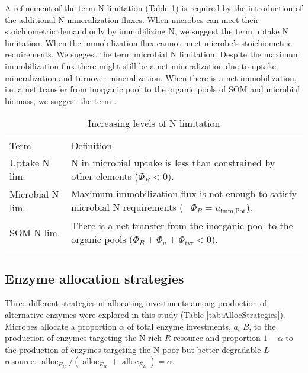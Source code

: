 A refinement of the term N limitation (Table \ref{tab:NutrientLimDefs}) is
required by the introduction of the additional N mineralization fluxes.
When microbes can meet their stoichiometric demand only by immobilizing
 N, we suggest the term uptake N limitation.
When the immobilization flux cannot meet microbe's stoichiometric requirements,
We suggest the term microbial N limitation. Despite the maximum immobilization
flux there might still be a net mineralization due to uptake mineralization and
turnover mineralization.
When there is a net immobilization, i.e. a net transfer from inorganic pool to
the organic pools of SOM and microbial biomass, we suggest the term .

\begin{table}[t]
\caption{Increasing levels of N limitation \label{tab:NutrientLimDefs}}
\centering
\begin{tabular}{lp{5.5cm}}
\tophline
Term &  Definition \\
\middlehline
Uptake N lim. & N in microbial uptake is less than 
constrained by other elements (${\Phi_B < 0}$).
\\
Microbial N lim. & Maximum immobilization flux is not enough to satisfy
microbial N requirements (${-\Phi_B =
u_{\operatorname{imm,Pot}}}$).
\\
SOM N lim. & There is a net transfer from the inorganic pool to
the organic pools (${\Phi_B+\Phi_u+\Phi_{\operatorname{tvr}}<0}$).
\\
\bottomhline
\end{tabular}
\end{table}
 



\subsection{ Enzyme allocation strategies} 
\label{sec:AllocStrategies}

Three different strategies of allocating investments among production of
alternative enzymes were explored in this study (Table
\ref{tab:AllocStrategies}). Microbes allocate a proportion $\alpha$ of total
enzyme investments, $a_e\,B$, to the production of enzymes targeting the N rich
$R$ resource and proportion $1 - \alpha$ to the production of enzymes targeting
the N poor but better degradable $L$ resource: $\operatorname{alloc}_{E_R} /
(\operatorname{alloc}_{E_R} + \operatorname{alloc}_{E_L}) = \alpha$.

